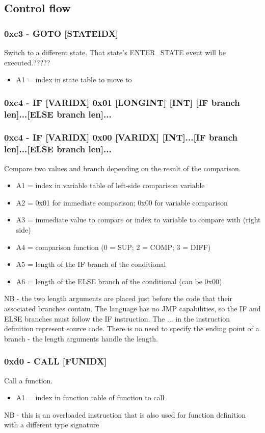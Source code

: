 \documentclass[12pt,a4paper]{scrbook}
\begin{document}
\subsection{Control flow}

\subsubsection{0xc3 - GOTO [STATEIDX]}
Switch to a different state.  That state's ENTER\_STATE event will be executed.?????
\begin{itemize}
\item A1 = index in state table to move to
\end{itemize}

\subsubsection{0xc4 - IF [VARIDX] 0x01 [LONGINT] [INT] [IF branch len]...[ELSE branch len]...}
\subsubsection{0xc4 - IF [VARIDX] 0x00 [VARIDX] [INT]...[IF branch len]...[ELSE branch len]...}
Compare two values and branch depending on the result of the comparison.
\begin{itemize}
\item A1 = index in variable table of left-side comparison variable
\item A2 = 0x01 for immediate comparison; 0x00 for variable comparison
\item A3 = immediate value to compare or index to variable to compare with (right side)
\item A4 = comparison function (0 = SUP; 2 = COMP; 3 = DIFF)
\item A5 = length of the IF branch of the conditional
\item A6 = length of the ELSE branch of the conditional (can be 0x00)
\end{itemize}
NB - the two length arguments are placed just before the code that their associated branches contain.
The language has no JMP capabilities, so the IF and ELSE branches must follow the IF instruction.
The ... in the instruction definition represent source code.  There is no need to specify the
ending point of a branch - the length arguments handle the length.

\subsubsection{0xd0 - CALL [FUNIDX]}
Call a function.
\begin{itemize}
\item A1 = index in function table of function to call
\end{itemize}
NB - this is an overloaded instruction that is also used for function definition with a different
type signature
\end{document}
